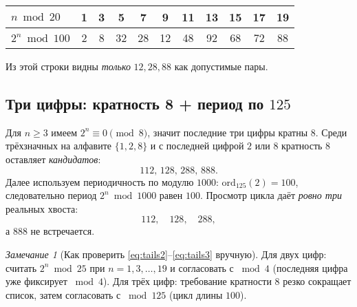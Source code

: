 \documentclass[12pt]{article}
\theoremstyle{plain}
\theoremstyle{remark}
\newtheorem*{remark}{Замечание}
\begin{document}
\begin{center}
\renewcommand{\arraystretch}{1.05}
\begin{tabular}{@{}lcccccccccc@{}}
\toprule
$n\bmod 20$ & 1 & 3 & 5 & 7 & 9 & 11 & 13 & 15 & 17 & 19 \\
\midrule
$2^n\bmod 100$ & 2 & 8 & 32 & 28 & 12 & 48 & 92 & 68 & 72 & 88 \\
\bottomrule
\end{tabular}
\end{center}

Из этой строки видны \emph{только} $12,28,88$ как допустимые пары.

\subsection*{Три цифры: кратность 8 + период по $125$}
Для $n\ge3$ имеем $2^n\equiv0\pmod8$, значит последние три цифры кратны $8$. Среди трёхзначных на алфавите $\{1,2,8\}$ и с последней цифрой $2$ или $8$ кратность $8$ оставляет \emph{кандидатов}:
\[
112,\,128,\,288,\,888.
\]
Далее используем периодичность по модулю $1000$: $\mathrm{ord}_{125}(2)=100$, следовательно период $2^n\bmod1000$ равен $100$. Просмотр цикла даёт \emph{ровно три} реальных хвоста:
\begin{equation}\label{eq:tails3}
\boxed{112,\quad 128,\quad 288,}
\end{equation}
а $888$ не встречается.

\begin{remark}[Как проверить \eqref{eq:tails2}–\eqref{eq:tails3} вручную]
Для двух цифр: считать $2^n\bmod25$ при $n=1,3,\ldots,19$ и согласовать с $\bmod4$ (последняя цифра уже фиксирует $\bmod4$). Для трёх цифр: требование кратности $8$ резко сокращает список, затем согласовать с $\bmod125$ (цикл длины $100$).
\end{remark}
\end{document}
